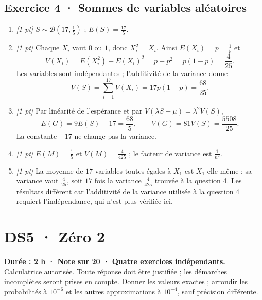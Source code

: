 \subsection*{Exercice 4 · Sommes de variables aléatoires}\begin{enumerate}

\item \textit{[1 pt]} $S\sim\mathcal B(17,\frac{1}{5})$ ; $E(S)=\frac{17}{5}$.

\item \textit{[1 pt]} Chaque $X_i$ vaut $0$ ou $1$, donc $X_i^2=X_i$. Ainsi $E(X_i)=p=\frac{1}{5}$ et
\[V(X_i)=E(X_i^2)-E(X_i)^2=p-p^2=p(1-p)=\frac{4}{25}.\]
Les variables sont indépendantes ; l'additivité de la variance donne
\[V(S)=\sum_{i=1}^{17}V(X_i)=17p(1-p)=\frac{68}{25}.\]

\item \textit{[1 pt]} Par linéarité de l'espérance et par $V(\lambda S+\mu)=\lambda^2V(S)$,
\[E(G)=9E(S)-17=\frac{68}{5},\qquad V(G)=81V(S)=\frac{5508}{25}.\]
La constante $-17$ ne change pas la variance.

\item \textit{[1 pt]} $E(M)=\frac{1}{5}$ et $V(M)=\frac{4}{425}$ ; le facteur de variance est $\frac{1}{n^2}$.

\item \textit{[1 pt]} La moyenne de $17$ variables toutes égales à $X_1$ est $X_1$ elle-même : sa variance vaut $\frac{4}{25}$, soit $17$ fois la variance $\frac{4}{425}$ trouvée à la question 4. Les résultats diffèrent car l'additivité de la variance utilisée à la question 4 requiert l'indépendance, qui n'est plus vérifiée ici.

\end{enumerate}

\fi

\mxnewpage{}\label{sujet:7-2}

\section*{DS5 · Zéro 2}


\textbf{Durée : 2 h · Note sur 20 · Quatre exercices indépendants.}\\Calculatrice autorisée. Toute réponse doit être justifiée ; les démarches incomplètes seront prises en compte. Donner les valeurs exactes ; arrondir les probabilités à $10^{-6}$ et les autres approximations à $10^{-4}$, sauf précision différente.

